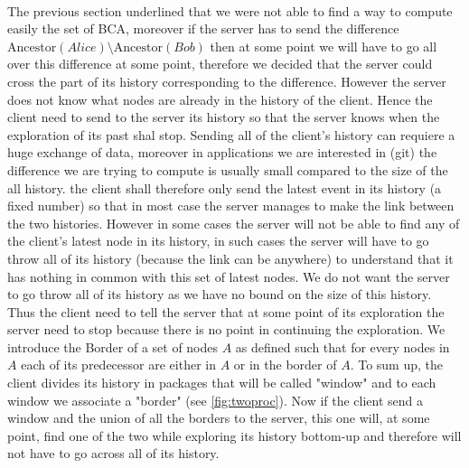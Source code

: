 \paragraph{} The previous section underlined that we were not able to find a way to compute easily the set of BCA, moreover if the server has to send the difference $\mathrm{Ancestor}(Alice) \setminus \mathrm{Ancestor}(Bob)$ then at some point we will have to go all over this difference at some point, therefore we decided that the server could cross the part of its history corresponding to the difference. However the server does not know what nodes are already in the history of the client. Hence the client need to send to the server its history so that the server knows when the exploration of its past shal stop. Sending all of the client's history can requiere a huge exchange of data, moreover in applications we are interested in (git) the difference we are trying to compute is usually small compared to the size of the all history. the client shall therefore only send the latest event in its history (a fixed number) so that in most case the server manages to make the link between the two histories. However in some cases the server will not be able to find any of the client's latest node in its history, in such cases the server will have to go throw all of its history (because the link can be anywhere) to understand that it has nothing in common with this set of latest nodes. We do not want the server to go throw all of its history as we have no bound on the size of this history. Thus the client need to tell the server that at some point of its exploration the server need to stop because there is no point in continuing the exploration. We introduce the Border of a set of nodes $A$ as defined such that for every nodes in $A$ each of its predecessor are either in $A$ or in the border of $A$. To sum up, the client divides its history in packages that will be called "window" and to each window we associate a "border" (see \ref{fig:twoproc}). Now if the client send a window and the union of all the borders to the server, this one will, at some point, find one of the two while exploring its history bottom-up and therefore will not have to go across all of its history.

